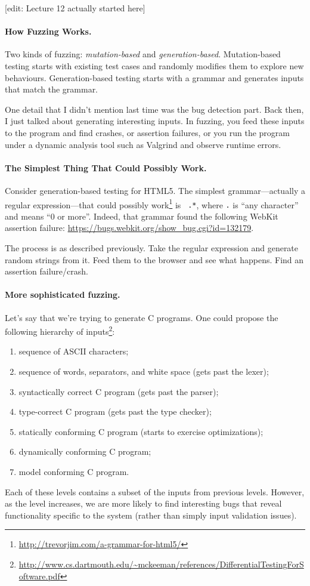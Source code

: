 \documentclass[11pt]{article}
\begin{document}
[edit: Lecture 12 actually started here]

\paragraph{How Fuzzing Works.} 
Two kinds of fuzzing: \emph{mutation-based} and
\emph{generation-based}. Mutation-based testing starts with
existing test cases and randomly modifies them to explore new behaviours.
Generation-based testing starts with a grammar and generates
inputs that match the grammar.

One detail that I didn't mention last time was the bug detection
part.  Back then, I just talked about generating interesting
inputs. In fuzzing, you feed these inputs to the program and find
crashes, or assertion failures, or you run the program under a dynamic
analysis tool such as Valgrind and observe runtime errors.

\paragraph{The Simplest Thing That Could Possibly Work.}
Consider generation-based testing for HTML5.  The simplest grammar---actually a regular
expression---that could possibly
work\footnote{\url{http://trevorjim.com/a-grammar-for-html5/}} is {\tt
  .*}, where {\tt .} is ``any character'' and {\tt *} means ``0 or
more''. Indeed, that grammar found the following WebKit assertion failure:
\url{https://bugs.webkit.org/show_bug.cgi?id=132179}.

The process is as described previously. Take the regular expression
and generate random strings from it.  Feed them to the browser and see
what happens. Find an assertion failure/crash.

\paragraph{More sophisticated fuzzing.} Let's say that we're trying to
generate C programs. One could propose the following hierarchy of inputs\footnote{\url{http://www.cs.dartmouth.edu/~mckeeman/references/DifferentialTestingForSoftware.pdf}}:
\begin{enumerate}
\item sequence of ASCII characters;
\item sequence of words, separators, and white space (gets past the lexer);
\item syntactically correct C program (gets past the parser);
\item type-correct C program (gets past the type checker);
\item statically conforming C program (starts to exercise optimizations);
\item dynamically conforming C program;
\item model conforming C program.
\end{enumerate}
Each of these levels contains a subset of the inputs from
previous levels. However, as the level increases, we are more likely
to find interesting bugs that reveal functionality specific
to the system (rather than simply input validation issues).
\end{document}
